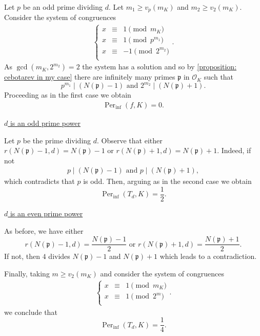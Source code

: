 \documentclass{amsart}
\def\OK{\mathcal{O}_K}
\DeclareMathOperator{\Per}{Per}
\theoremstyle{definition}
\begin{document}
Let $p$ be an odd prime dividing $d$. Let $m_1 \geq v_p(m_K)$ and $m_2 \geq v_2(m_K)$. Consider the system of congruences
\begin{align*}
\left \{ \begin{matrix} 
x &\equiv & 1 \pmod{m_K} \\
x &\equiv & 1 \pmod{p^{m_1}} \\
x &\equiv & -1 \pmod{2^{m_2}} \\
\end{matrix}\right..
\end{align*} 
As $\gcd(m_K, 2^{m_2}) = 2$ the system has a solution and so by \cref{proposition: cebotarev in my case} there are infinitely many primes $\mathfrak{p}$ in $\OK$ such that 
$$p^{m_1} \mid (N(\mathfrak{p})-1) \text{ and } 2^{m_2} \mid (N(\mathfrak{p})+1).$$ Proceeding as in the first case we obtain 
\begin{align*}
\Per_{\inf}(f,K) = 0.
\end{align*}

\bigskip

 \underline{$d$ is an odd prime power}

Let $p$ be the prime dividing $d$. Observe that either $r(N(\mathfrak{p})-1,d) = N(\mathfrak{p})-1$ or $r(N(\mathfrak{p})+1,d) = N(\mathfrak{p})+1$. Indeed, if not
\begin{align*}
p \mid (N(\mathfrak{p})-1) \text{ and } p \mid (N(\mathfrak{p})+1),
\end{align*}
which contradicts that $p$ is odd. Then, arguing as in the second case we obtain $$\Per_{\inf}(T_d,K) = \frac{1}{2}.$$ 

\bigskip

 \underline{$d$ is an even prime power}

As before, we have either $$r(N(\mathfrak{p})-1,d) = \frac{N(\mathfrak{p})-1}{2} \text{ or } r(N(\mathfrak{p})+1,d) = \frac{N(\mathfrak{p})+1}{2}.$$ If not, then $4$ divides $N(\mathfrak{p})-1$ and $N(\mathfrak{p})+1$ which leads to a contradiction. 

Finally, taking $m \geq v_2(m_K)$ and consider the system of congruences
\begin{align*}
\left \{ \begin{matrix} 
x &\equiv & 1 \pmod{m_K} \\
x &\equiv & 1 \pmod{2^m} \\
\end{matrix}\right..
\end{align*} 
we conclude that
$$\Per_{\inf}(T_d,K) = \frac{1}{4}.$$ 
\end{document}
